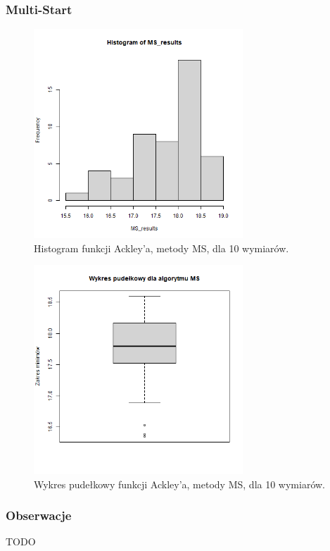 \documentclass{lab}
\begin{document}
\subsubsection{Multi-Start}
\begin{figure}[H]
  \centering
  \includegraphics[width=0.7\textwidth]{img/dim10_MS_Ackley_his.png}
  \caption{Histogram funkcji Ackley'a, metody MS, dla 10 wymiarów.}
\end{figure}
\begin{figure}[H]
  \centering
  \includegraphics[width=0.7\textwidth]{img/dim10_MS_Ackley.png}
  \caption{Wykres pudełkowy funkcji Ackley'a, metody MS, dla 10 wymiarów.}
\end{figure}

\subsubsection{Obserwacje}
TODO
\end{document}

